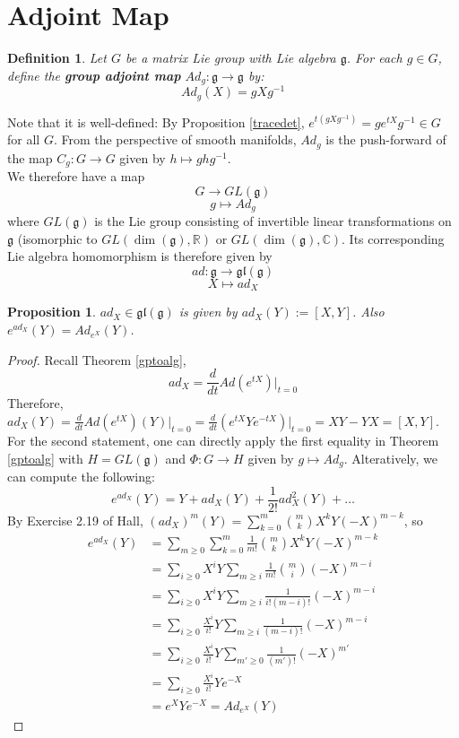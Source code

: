 \documentclass[11pt]{book}
\newtheorem{proposition}[theorem]{Proposition}
\newtheorem{definition}[theorem]{Definition}
\newcommand{\bb}[1]{\mathbb{#1}}
\newcommand{\mf}[1]{\mathfrak{#1}}
\begin{document}
\section{Adjoint Map}
\begin{definition}
Let $G$ be a matrix Lie group with Lie algebra $\mf{g}$. For each $g \in G$, define the \textbf{group adjoint map} $Ad_g: \mf{g} \to \mf{g}$ by:
$$Ad_g(X) = gXg^{-1}$$
\end{definition}
Note that it is well-defined: By Proposition \ref{tracedet}, $e^{t(gXg^{-1})} = ge^{tX}g^{-1} \in G$ for all $G$. From the perspective of smooth manifolds, $Ad_g$ is the push-forward of the map $C_g : G \to G$ given by $h \mapsto ghg^{-1}$.\\
We therefore have a map
$$G \to GL(\mf{g})$$
$$g \mapsto Ad_g$$
where $GL(\mf{g})$ is the Lie group consisting of invertible linear transformations on $\mf{g}$ (isomorphic to $GL(\dim(\mf{g}),\bb{R})$ or $GL(\dim(\mf{g}),\bb{C})$. Its corresponding Lie algebra homomorphism is therefore given by
$$ad: \mf{g} \to \mf{gl}(\mf{g})$$
$$X \mapsto ad_X$$
\begin{proposition}
$ad_X \in \mf{gl}(\mf{g})$ is given by $ad_X(Y) := [X,Y]$. Also $e^{ad_X}(Y) = Ad_{e^X}(Y)$.
\end{proposition}
\begin{proof}
Recall Theorem \ref{gptoalg},
$$ad_X = \frac{d}{dt}Ad(e^{tX})  \Big|_{t=0}$$
Therefore, $ad_X(Y) = \frac{d}{dt}Ad(e^{tX})(Y)  \Big|_{t=0} = \frac{d}{dt}(e^{tX}Ye^{-tX})  \Big|_{t=0} = XY - YX = [X,Y]$.\\

For the second statement, one can directly apply the first equality in Theorem \ref{gptoalg} with $H = GL(\mf{g})$ and $\Phi:G \to H$ given by $g \mapsto Ad_g$. Alteratively, we can compute the following:
$$e^{ad_X}(Y) = Y + ad_X(Y) + \frac{1}{2!} ad_{X}^2(Y) + \dots$$
By Exercise 2.19 of Hall, $(ad_X)^m(Y) = \sum_{k = 0}^{m} {m \choose k} X^kY(-X)^{m-k}$, so
\begin{align*}
e^{ad_X}(Y) &= \sum_{m \geq 0} \sum_{k = 0}^{m} \frac{1}{m!}{m \choose k} X^kY(-X)^{m-k}\\
& = \sum_{i \geq 0} X^iY \sum_{m \geq i} \frac{1}{m!}{m \choose i} (-X)^{m-i}\\
& = \sum_{i \geq 0} X^iY \sum_{m \geq i} \frac{1}{i!(m-i)!} (-X)^{m-i}\\
& = \sum_{i \geq 0} \frac{X^i}{i!} Y \sum_{m \geq i} \frac{1}{(m-i)!} (-X)^{m-i}\\
& = \sum_{i \geq 0} \frac{X^i}{i!} Y \sum_{m' \geq 0} \frac{1}{(m')!} (-X)^{m'}\\
& = \sum_{i \geq 0} \frac{X^i}{i!} Y e^{-X}\\
& = e^X Y e^{-X} = Ad_{e^X}(Y)
\end{align*}
\end{proof}
\end{document}
